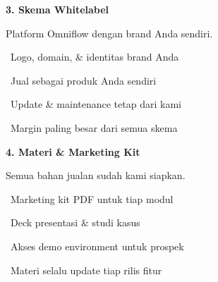 \documentclass[a4paper]{article}
\begin{document}
\vspace{8pt}

\noindent
\begin{minipage}[t]{0.485\textwidth}
    \colorbox{PurplePrimary}{%
        \begin{minipage}{\dimexpr\textwidth-2\fboxsep\relax}
            {\fontsize{10}{13}\selectfont\bfseries\color{White} 3. Skema Whitelabel}
        \end{minipage}}\par
    \vspace{4pt}
    {\fontsize{9}{12}\selectfont\color{TextDark}%
    Platform Omniflow dengan brand Anda sendiri.\par\vspace{3pt}
    \textbullet\ Logo, domain, \& identitas brand Anda\par\vspace{2pt}%
    \textbullet\ Jual sebagai produk Anda sendiri\par\vspace{2pt}%
    \textbullet\ Update \& maintenance tetap dari kami\par\vspace{2pt}%
    \textbullet\ Margin paling besar dari semua skema}%
\end{minipage}%
\hfill
\begin{minipage}[t]{0.485\textwidth}
    \colorbox{BlueDark}{%
        \begin{minipage}{\dimexpr\textwidth-2\fboxsep\relax}
            {\fontsize{10}{13}\selectfont\bfseries\color{White} 4. Materi \& Marketing Kit}
        \end{minipage}}\par
    \vspace{4pt}
    {\fontsize{9}{12}\selectfont\color{TextDark}%
    Semua bahan jualan sudah kami siapkan.\par\vspace{3pt}
    \textbullet\ Marketing kit PDF untuk tiap modul\par\vspace{2pt}%
    \textbullet\ Deck presentasi \& studi kasus\par\vspace{2pt}%
    \textbullet\ Akses demo environment untuk prospek\par\vspace{2pt}%
    \textbullet\ Materi selalu update tiap rilis fitur}%
\end{minipage}
\end{document}
